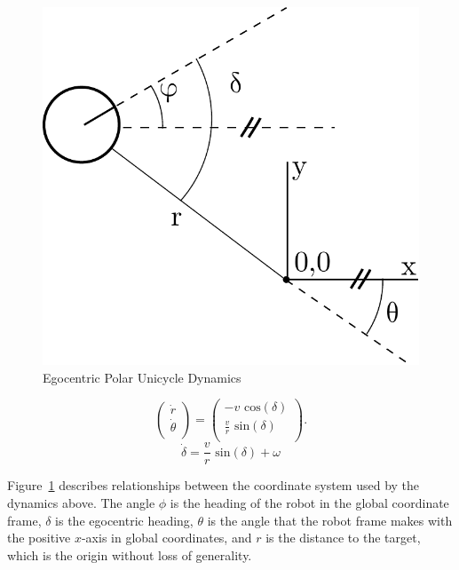 \documentclass[journal]{IEEEtran}
\begin{document}
\begin{figure}[h!]
\begin{center}
\includegraphics[scale=0.45]{uni.pdf} 
\caption{Egocentric Polar Unicycle Dynamics\label{fig:uni}} 
\end{center}
\end{figure}

\begin{equation}
\left(
\begin{matrix}
\dot{r}\\
\dot{\theta}\\
\end{matrix}
\right)
=
\left(
\begin{matrix}
- v \text{ cos}(\delta)\\
\frac{v}{r} \text{ sin}(\delta)\\
\end{matrix}
\right).
\end{equation}
\begin{equation}
\dot{\delta}=\frac{v}{r} \text{ sin}(\delta)+\omega
\end{equation}

Figure~\ref{fig:uni} describes relationships between the coordinate system used by the dynamics above. The angle $\phi$ is the heading of the robot in the global coordinate frame, $\delta$ is the egocentric heading, $\theta$ is the angle that the robot frame makes with the positive $x$-axis in global coordinates, and $r$ is the distance to the target, which is the origin without loss of generality. 
\end{document}
